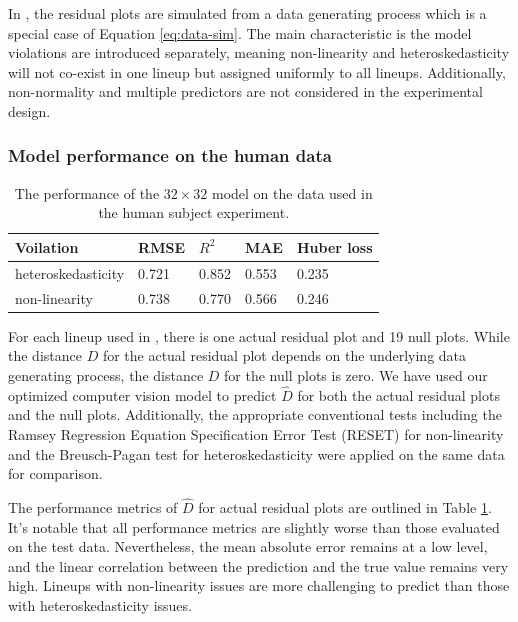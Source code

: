 \documentclass[]{interact}
\theoremstyle{plain}%
\theoremstyle{definition}
\theoremstyle{remark}
\begin{document}
In \citet{li2023plot}, the residual plots are simulated from a data
generating process which is a special case of Equation
\ref{eq:data-sim}. The main characteristic is the model violations are
introduced separately, meaning non-linearity and heteroskedasticity will
not co-exist in one lineup but assigned uniformly to all lineups.
Additionally, non-normality and multiple predictors are not considered
in the experimental design.

\hypertarget{model-performance-on-the-human-data}{%
\subsubsection{Model performance on the human
data}\label{model-performance-on-the-human-data}}

\begin{table}

\caption{\label{tab:experiment-performance}The performance of the $32 \times 32$ model on the data used in the human subject experiment.}
\centering
\begin{tabular}[t]{lllll}
\toprule
Voilation & RMSE & $R^2$ & MAE & Huber loss\\
\midrule
heteroskedasticity & 0.721 & 0.852 & 0.553 & 0.235\\
non-linearity & 0.738 & 0.770 & 0.566 & 0.246\\
\bottomrule
\end{tabular}
\end{table}

For each lineup used in \citet{li2023plot}, there is one actual residual
plot and 19 null plots. While the distance \(D\) for the actual residual
plot depends on the underlying data generating process, the distance
\(D\) for the null plots is zero. We have used our optimized computer
vision model to predict \(\hat{D}\) for both the actual residual plots
and the null plots. Additionally, the appropriate conventional tests
including the Ramsey Regression Equation Specification Error Test
(RESET) \citep{ramsey1969tests} for non-linearity and the Breusch-Pagan
test \citep{breusch1979simple} for heteroskedasticity were applied on
the same data for comparison.

The performance metrics of \(\hat{D}\) for actual residual plots are
outlined in Table \ref{tab:experiment-performance}. It's notable that
all performance metrics are slightly worse than those evaluated on the
test data. Nevertheless, the mean absolute error remains at a low level,
and the linear correlation between the prediction and the true value
remains very high. Lineups with non-linearity issues are more
challenging to predict than those with heteroskedasticity issues.
\end{document}
